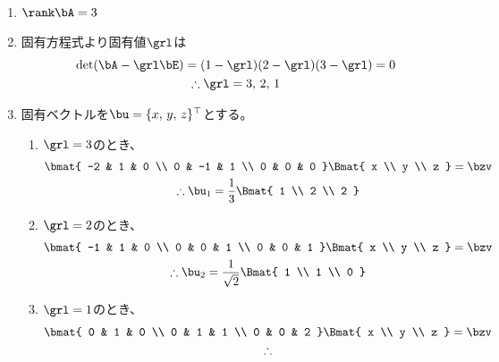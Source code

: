 \begin{ans*}
  ${}$
  \begin{enumerate}[label=(\arabic*)]
    \item $\rank\bA = 3$
    \item 固有方程式より固有値$\grl$は
    \begin{gather}
      \det(\bA - \grl\bE) = (1-\grl)(2-\grl)(3-\grl) = 0 \\
      \therefore \grl = 3,\,2,\,1
    \end{gather}
    \item 固有ベクトルを$\bu = \{x,\,y,\,z\}^{\top}$とする。
    \begin{enumerate}[label=(\roman*)]
      \item $\grl = 3$のとき、
      \begin{gather}
        \bmat{
          -2 & 1 & 0 \\
          0 & -1 & 1 \\
          0 & 0 & 0
        }\Bmat{
          x \\ y \\ z
        } = \bzv \\
        \therefore
        \bu_{1} = \frac{1}{3}\Bmat{
          1 \\ 2 \\ 2
        }
      \end{gather}
      \item $\grl = 2$のとき、
      \begin{gather}
        \bmat{
          -1 & 1 & 0 \\
          0 & 0 & 1 \\
          0 & 0 & 1
        }\Bmat{
          x \\ y \\ z
        } = \bzv \\
        \therefore
        \bu_{2} = \frac{1}{\sqrt{2}}\Bmat{
          1 \\ 1 \\ 0
        }
      \end{gather}
      \item $\grl = 1$のとき、
      \begin{gather}
        \bmat{
          0 & 1 & 0 \\
          0 & 1 & 1 \\
          0 & 0 & 2
        }\Bmat{
          x \\ y \\ z
        } = \bzv \\
        \therefore

\end{gather}
\end{enumerate}
\end{enumerate}
\end{ans*}
